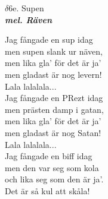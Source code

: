 \documentclass[a6paper,10pt]{article}
\newcommand{\mel}[1]{\small\textbf{\textit{mel. #1 \\}}}
\begin{document}
\vspace{-15pt}
\begin{center}
\Large $\delta6$e. Supen\\ 
\mel{Räven}
\end{center}
\vspace{-10pt}
Jag fångade en sup idag \\
men supen slank ur näven, \\
men lika gla' för det är ja' \\
men gladast är nog levern! 
\vspace{5pt} \\
Lala lalalala...
\vspace{5pt} \\
Jag fångade en PRezt idag \\
men prästen damp i gatan, \\
men lika gla' för det är ja' \\
men gladast är nog Satan!
\vspace{5pt} \\
Lala lalalala...
\vspace{5pt} \\
Jag fångade en biff idag \\
men den var seg som kola \\
och lika seg som den är ja'. \\
Det är så kul att skåla! 
\end{document}
